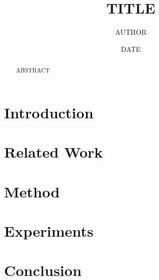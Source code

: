 \documentclass[11pt,a4paper]{article}
\title{{{TITLE}}}
\author{{{AUTHOR}}}
\date{{{DATE}}}
\begin{document}
\maketitle

\begin{abstract}
{{ABSTRACT}}
\end{abstract}

\section{Introduction}
\label{sec:introduction}


\section{Related Work}
\label{sec:related}


\section{Method}
\label{sec:method}


\section{Experiments}
\label{sec:experiments}


\section{Conclusion}
\label{sec:conclusion}


\printbibliography
\end{document}
